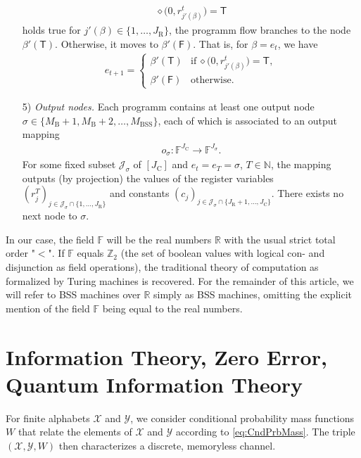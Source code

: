 \documentclass[conference]{IEEEtran}
\def\X{{\mathcal X}}
\def\Y{{\mathcal Y}}
\def\J{{\mathcal J}}
\def\NN{{\mathbb N}}
\def\RR{{\mathbb R}}
\def\ZZ{{\mathbb Z}}
\def\FF{{\mathbb F}}
\newcommand{\BSS}{\mathrm{BSS}}
\begin{document}
\begin{itemize}
						\begin{align*}	\diamond\big(0, r^t_{j'(\beta)}\big) = \mathsf{T} 
						\end{align*}
						holds true for \(j'(\beta) \in \{1,\ldots, J_\mathrm{R}\}\), the programm flow branches to the node \(\beta'(\mathsf{T})\). Otherwise, it moves to \(\beta'(\mathsf{F})\). 
						That is, for \(\beta = e_t\), we have
						\begin{align}   e_{t+1} =   \begin{cases}   \beta'(\mathsf{T})  &\text{if}~\diamond\big(0,r^t_{j'(\beta)}\big) = \mathsf{T},\\
																	\beta'(\mathsf{F})  &\text{otherwise}.
													\end{cases}    
						\end{align}
					\item[5)] \emph{Output nodes.} Each programm contains at least one output node \(\sigma \in \{M_{\mathrm{B}} + 1, M_{\mathrm{B}} + 2,\ldots, M_\BSS\}\), 
						each of which is associated to an output mapping
						\begin{align*}	o_\sigma : \FF^{J_{\mathrm{C}}}\rightarrow \FF^{J_{\sigma}}.
						\end{align*}
						For some fixed subset \(\J_\sigma\) of \([J_\mathrm{C}]\) and \(e_t = e_T = \sigma\), \(T\in\NN\), the mapping outputs (by projection) the values of the 
						register variables \((r_j^T)_{j\in \J_\sigma \cap \{1,\ldots,J_\mathrm{R}\}}\) and constants \((c_j)_{j\in \J_\sigma \cap \{J_\mathrm{R}+1,\ldots,J_\mathrm{C}\}}\). 
						There exists no next node to \(\sigma\).
	\end{itemize}
	In our case, the field \(\FF\) will be the real numbers \(\RR\) with the usual strict total order "\(<\)". If \(\FF\) equals \(\ZZ_2\) (the set of boolean values with logical con- and disjunction 
	as field operations), the traditional theory of computation as formalized by Turing machines is recovered. For the remainder of this article, we will refer to BSS machines over \(\RR\) 
	simply as BSS machines, omitting the explicit mention of the field \(\FF\) being equal to the real numbers. 

\section{Information Theory, Zero Error, Quantum Information Theory}
	For finite alphabets \(\X\) and \(\Y\), we consider conditional probability mass functions \(W\) that relate the elements of \(\X\) and \(\Y\) according to \eqref{eq:CndPrbMass}. 
	The triple \((\X,\Y,W)\) then characterizes a discrete, memoryless channel. 
\end{document}
